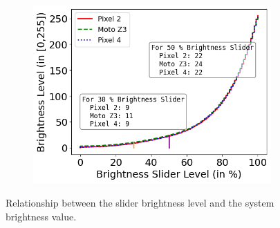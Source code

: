 

\begin{figure}[tb]
	\centering
	\begin{subfigure}[]{0.31\textwidth}
		\includegraphics[width=\textwidth]{figure/brightness_curve.png}
	\end{subfigure}
        \vspace{-0.1in}
	\caption{Relationship between the slider brightness level and the system brightness
		value.}
	\label{fig:brightnessslider_brightnesslevel}
\end{figure}

